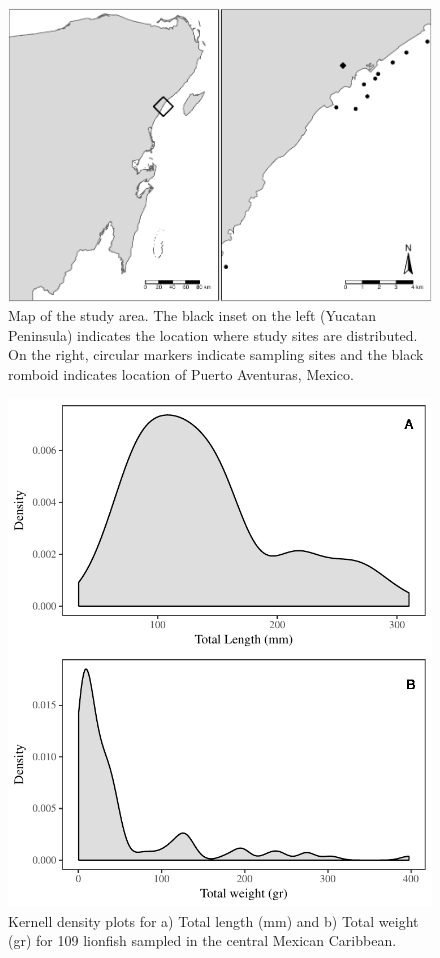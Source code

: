 \documentclass[12pt,]{article}
\begin{document}
\begin{figure}[htbp]
\centering
\includegraphics{Manuscript_files/figure-latex/unnamed-chunk-6-1.pdf}
\caption{Map of the study area. The black inset on the left (Yucatan
Peninsula) indicates the location where study sites are distributed. On
the right, circular markers indicate sampling sites and the black
romboid indicates location of Puerto Aventuras, Mexico.}
\end{figure}

\clearpage

\begin{figure}[htbp]
\centering
\includegraphics{Manuscript_files/figure-latex/unnamed-chunk-7-1.pdf}
\caption{Kernell density plots for a) Total length (mm) and b) Total
weight (gr) for 109 lionfish sampled in the central Mexican Caribbean.}
\end{figure}
\end{document}

